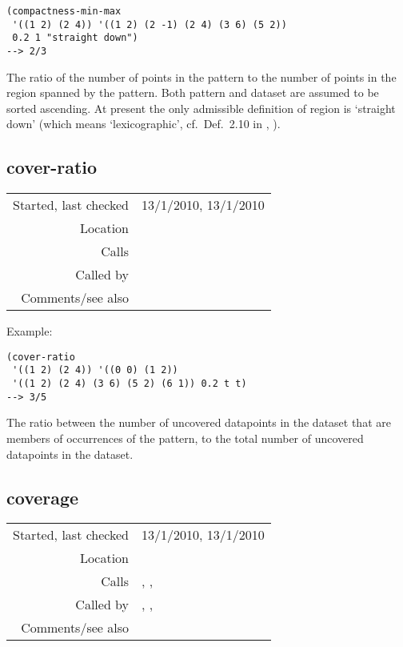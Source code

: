 \vspace{0.5cm}
\begin{verbatim}
(compactness-min-max
 '((1 2) (2 4)) '((1 2) (2 -1) (2 4) (3 6) (5 2))
 0.2 1 "straight down")
--> 2/3
\end{verbatim}

\noindent The ratio of the number of points in the
pattern to the number of points in the region spanned
by the pattern. Both pattern and dataset are assumed
to be sorted ascending. At present the only admissible
definition of region is `straight down' (which means
`lexicographic', cf.~Def.~2.10 in
\citeauthor{collins2011b},
\citeyear{collins2011b}).

\subsection*{cover-ratio}\label{fun:cover-ratio}

\vspace{0.3cm}
\begin{tabular}{r|p{8cm}}
Started, last checked & 13/1/2010, 13/1/2010 \\
Location & \nameref{sec:evaluation-heuristics} \\
Calls & \nameref{fun:coverage} \\
Called by & \nameref{fun:heuristics-pattern-translators-pair} \\
Comments/see also &
\end{tabular}

\vspace{0.5cm}
\noindent Example:
\begin{verbatim}
(cover-ratio
 '((1 2) (2 4)) '((0 0) (1 2))
 '((1 2) (2 4) (3 6) (5 2) (6 1)) 0.2 t t)
--> 3/5
\end{verbatim}

\noindent The ratio between the number of uncovered
datapoints in the dataset that are members of
occurrences of the pattern, to the total number of
uncovered datapoints in the dataset.


\subsection*{coverage}\label{fun:coverage}

\vspace{0.3cm}
\begin{tabular}{r|p{8cm}}
Started, last checked & 13/1/2010, 13/1/2010 \\
Location & \nameref{sec:evaluation-heuristics} \\
Calls & \nameref{fun:intersection-multidimensional}, \nameref{fun:translations},\newline \nameref{fun:unions-multidimensional-sorted-asc} \\
Called by & \nameref{fun:compression-ratio}, \nameref{fun:cover-ratio},\newline \nameref{fun:heuristics-pattern-translators-pair} \\
Comments/see also & \nameref{fun:coverage-mod-2nd-n}
\end{tabular}

